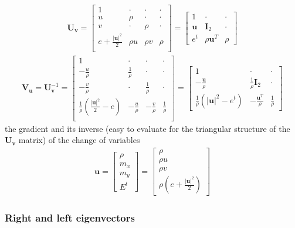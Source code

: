 \documentclass[letterpaper,10pt,english]{jupyterBook}
\begin{document}
\begin{equation*}
\begin{split}
\mathbf{U}_{\mathbf{v}} = 
\begin{bmatrix}
  1 & \cdot & \cdot & \cdot \\
  u & \rho  & \cdot & \cdot \\
  v & \cdot & \rho  & \cdot \\
  e + \frac{|\mathbf{u}|^2}{2} & \rho u & \rho v & \rho \\
\end{bmatrix}
= 
\begin{bmatrix}
 1 & \cdot & \cdot \\ 
 \mathbf{u} & \mathbf{I}_2 & \cdot \\
 e^t & \rho \mathbf{u}^T & \rho
\end{bmatrix}
\end{split}
\end{equation*}\begin{equation*}
\begin{split}
\mathbf{V}_{\mathbf{u}} = 
\mathbf{U}_{\mathbf{v}}^{-1} = 
\begin{bmatrix}
  1 & \cdot & \cdot & \cdot \\
  -\frac{u}{\rho} & \frac{1}{\rho}  & \cdot & \cdot \\
  -\frac{v}{\rho} & \cdot & \frac{1}{\rho}  & \cdot \\
  \frac{1}{\rho} \left( \frac{|\mathbf{u}|^2}{2} - e \right) & -\frac{ u}{\rho} & -\frac{ v}{\rho} & \frac{1}{\rho} \\
\end{bmatrix} 
=
\begin{bmatrix}
  1 & \cdot & \cdot \\
  - \frac{\mathbf{u}}{\rho} & \frac{1}{\rho} \mathbf{I}_2 & \cdot \\
  \frac{1}{\rho} \left( |\mathbf{u}|^2 - e^t \right) & - \frac{\mathbf{u}^T}{\rho} & \frac{1}{\rho}
\end{bmatrix} 
\end{split}
\end{equation*}
\sphinxAtStartPar
the gradient and its inverse (easy to evaluate for the triangular structure of the \(\mathbf{U}_{\mathbf{v}}\) matrix) of the change of variables
\begin{equation*}
\begin{split}\mathbf{u} = \begin{bmatrix} \rho \\ m_x \\ m_y \\ E^t \end{bmatrix} = \begin{bmatrix} \rho \\ \rho u \\ \rho v \\ \rho \left( e + \frac{|\mathbf{u}|^2}{2} \right) \end{bmatrix}\end{split}
\end{equation*}\subsubsection*{Right and left eigenvectors}
\end{document}
